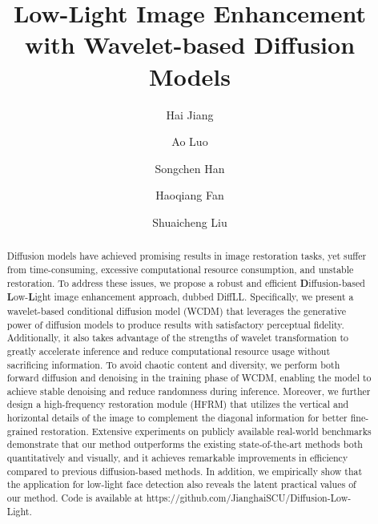 \documentclass[acmtog]{acmart}
\begin{document}
\title{Low-Light Image Enhancement with Wavelet-based Diffusion Models}
\author{Hai Jiang}
  
  \author{Ao Luo}
  
    \author{Songchen Han}
  
      \author{Haoqiang Fan}
  
        \author{Shuaicheng Liu}


\begin{abstract}
Diffusion models have achieved promising results in image restoration tasks, yet suffer from time-consuming, excessive computational resource consumption, and unstable restoration. To address these issues, we propose a robust and efficient \textbf{D}iffusion-based \textbf{L}ow-\textbf{L}ight image enhancement approach, dubbed DiffLL. Specifically, we present a wavelet-based conditional diffusion model (WCDM) that leverages the generative power of diffusion models to produce results with satisfactory perceptual fidelity. Additionally, it also takes advantage of the strengths of wavelet transformation to greatly accelerate inference and reduce computational resource usage without sacrificing information. To avoid chaotic content and diversity, we perform both forward diffusion and denoising in the training phase of WCDM, enabling the model to achieve stable denoising and reduce randomness during inference. Moreover, we further design a high-frequency restoration module (HFRM) that utilizes the vertical and horizontal details of the image to complement the diagonal information for better fine-grained restoration. Extensive experiments on publicly available real-world benchmarks demonstrate that our method outperforms the existing state-of-the-art methods both quantitatively and visually, and it achieves remarkable improvements in efficiency compared to previous diffusion-based methods. In addition, we empirically show that the application for low-light face detection also reveals the latent practical values of our method. Code is available at https://github.com/JianghaiSCU/Diffusion-Low-Light.
\end{abstract}
\end{document}

